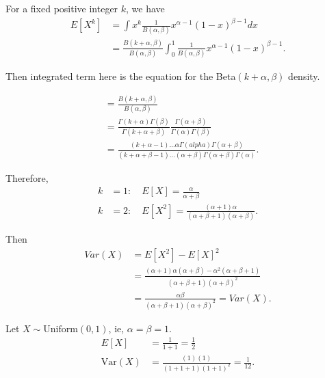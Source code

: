 For a fixed positive integer $k$, we have 
 \begin{align*}
	 E \left[ X^{k} \right] &= \int x^{k}\frac{1}{B\left( \alpha , \beta \right) }x ^{\alpha - 1} \left( 1 - x \right) ^{\beta - 1}dx \\
				&= \frac{B \left( k + \alpha , \beta \right) }{B\left( \alpha , \beta \right) }\int_{0 }^{1} \frac{1}{B\left( \alpha , \beta \right) }x ^{\alpha - 1} \left( 1 - x \right) ^{\beta - 1}  
.\end{align*}

Then integrated term here is the equation for the Beta$\left( k + \alpha, \beta \right) $ density. 

\begin{align*}
	&= \frac{B \left( k + \alpha , \beta \right) }{B\left( \alpha , \beta \right) }\\
	&= \frac{\Gamma \left( k + \alpha \right) \Gamma\left( \beta \right) }{\Gamma \left( k + \alpha + \beta \right) } \frac{\Gamma\left( \alpha + \beta  \right) }{\Gamma\left( \alpha  \right) \Gamma\left( \beta \right) } \\
	&= \frac{\left( k + \alpha - 1 \right) \ldots \alpha \Gamma \left( alpha \right) \Gamma\left( \alpha + \beta \right) } {\left( k + \alpha + \beta - 1 \right) \ldots \left( \alpha + \beta \right) \Gamma\left( \alpha + \beta  \right) \Gamma\left( \alpha \right) }
.\end{align*}

Therefore, 
\begin{align*}
k &= 1 : \quad E \left[ X \right]  = \frac{\alpha }{\alpha + \beta} \\
k &= 2 : \quad E \left[ X^2 \right]  = \frac{\left( \alpha + 1 \right) \alpha }{\left( \alpha + \beta + 1 \right)  \left( \alpha + \beta \right) }
.\end{align*}

Then 
\begin{align*}
	Var \left( X \right) &= E \left[ X^2 \right]  - E\left[ X \right] ^2 \\
			     &= \frac{\left( \alpha + 1 \right) \alpha \left( \alpha + \beta  \right) - \alpha ^2 \left( \alpha + \beta + 1 \right) }{\left( \alpha + \beta + 1 \right) \left( \alpha + \beta  \right) ^2} \\
			     &= \frac{\alpha \beta }{\left( \alpha + \beta + 1 \right) \left( \alpha + \beta  \right) ^2} = Var\left( X \right)  
.\end{align*}

\begin{eg}
	Let $X \sim \text{Uniform}\left( 0, 1 \right) $, ie, $\alpha = \beta = 1$. 
	\begin{align*}
		E\left[ X \right] &= \frac{1}{1 + 1} = \frac{1}{2} \\
		\text{Var}\left( X \right) &= \frac{\left( 1 \right) \left( 1 \right) }{\left( 1 + 1 + 1 \right) \left( 1 + 1  \right) ^2} = \frac{1}{12}
	.\end{align*}
\end{eg}

